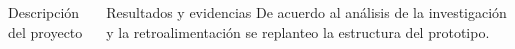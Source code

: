 \documentclass{beamer}
\begin{document}
\begin{frame}[fragile]{}
\begin{columns}[t]
\begin{column}{0.46\textwidth}
\begin{block}{Descripción del proyecto}
\begin{minipage}[t]{1\linewidth}
			\end{minipage} 
	  	\end{block}
	  \end{column}
	
	 \begin{column}{0.46\linewidth}
	 	\begin{block}{Resultados y evidencias}
	 	De acuerdo al análisis de la investigación y la retroalimentación se replanteo la estructura del prototipo.
	 	\begin{figure}[H]
	 		\centering

\end{figure}
\end{block}
\end{column}
\end{columns}
\end{frame}
\end{document}
